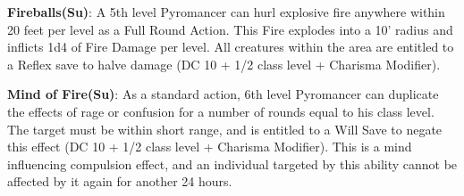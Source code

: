 \textbf{Fireballs(Su)}: A 5th level Pyromancer can hurl explosive fire anywhere within 20 feet per level as a Full Round Action. This Fire explodes into a 10’ radius and inflicts 1d4 of Fire Damage per level. All creatures within the area are entitled to a Reflex save to halve damage (DC 10 + 1/2 class level + Charisma Modifier). 

\textbf{Mind of Fire(Su)}: As a standard action, 6th level Pyromancer can duplicate the effects of rage or confusion for a number of rounds equal to his class level. The target must be within short range, and is entitled to a Will Save to negate this effect (DC 10 + 1/2 class level + Charisma Modifier). This is a mind influencing compulsion effect, and an individual targeted by this ability cannot be affected by it again for another 24 hours.